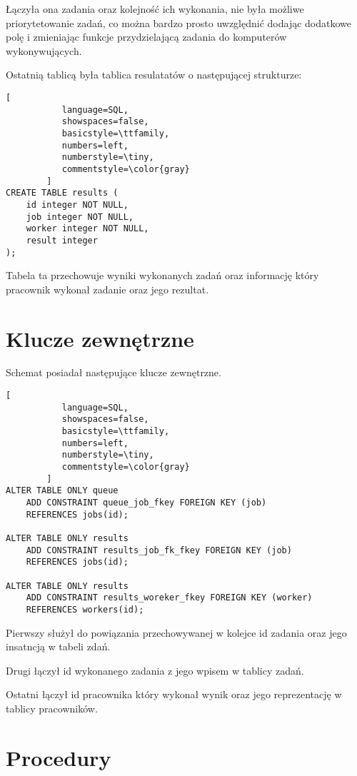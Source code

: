 \documentclass[paper=a4, fontsize=11pt]{scrartcl} %
\numberwithin{equation}{section} %
\numberwithin{figure}{section} %
\numberwithin{table}{section} %
\begin{document}
Łączyła ona zadania oraz kolejność ich wykonania, nie była możliwe priorytetowanie zadań, co można bardzo
prosto uwzględnić dodając dodatkowe polę i zmieniając funkcje przydzielającą zadania do komputerów wykonywujących.

Ostatnią tablicą była tablica resulatatów o następującej strukturze:

\begin{lstlisting}[
           language=SQL,
           showspaces=false,
           basicstyle=\ttfamily,
           numbers=left,
           numberstyle=\tiny,
           commentstyle=\color{gray}
        ]
CREATE TABLE results (
    id integer NOT NULL,
    job integer NOT NULL,
    worker integer NOT NULL,
    result integer
);
\end{lstlisting}

Tabela ta przechowuje wyniki wykonanych zadań oraz informację który pracownik wykonał zadanie oraz jego rezultat.


\newpage
\section {Klucze zewnętrzne}

Schemat posiadał następujące klucze zewnętrzne.

\begin{lstlisting}[
           language=SQL,
           showspaces=false,
           basicstyle=\ttfamily,
           numbers=left,
           numberstyle=\tiny,
           commentstyle=\color{gray}
        ]
ALTER TABLE ONLY queue
    ADD CONSTRAINT queue_job_fkey FOREIGN KEY (job)
    REFERENCES jobs(id);

ALTER TABLE ONLY results
    ADD CONSTRAINT results_job_fk_fkey FOREIGN KEY (job) 
    REFERENCES jobs(id);

ALTER TABLE ONLY results
    ADD CONSTRAINT results_woreker_fkey FOREIGN KEY (worker) 
    REFERENCES workers(id);

\end{lstlisting}

Pierwszy służył do powiązania przechowywanej w kolejce id zadania oraz jego insatncją w tabeli zdań.

Drugi łączył id wykonanego zadania z jego wpisem w tablicy zadań.

Ostatni łączył id pracownika który wykonał wynik oraz jego reprezentację w tablicy pracowników.

\newpage
\section {Procedury}
\end{document}

